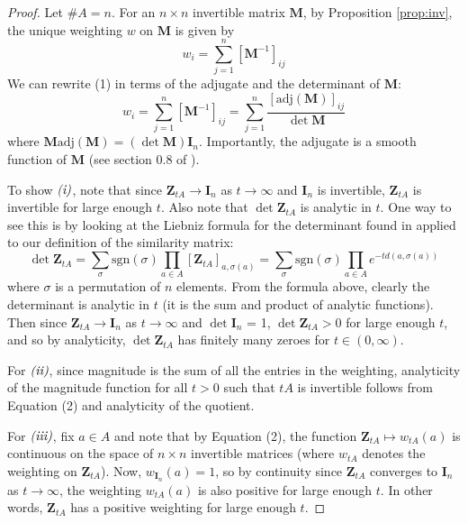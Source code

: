 \documentclass[11pt]{article}
\theoremstyle{definition}
\theoremstyle{definition}
\theoremstyle{plain}
\theoremstyle{plain}
\theoremstyle{plain}
\theoremstyle{definition}
\begin{document}
\begin{proof}
Let $\#A = n$. For an $n \times n$ invertible matrix $\mathbf{M}$, by Proposition \ref{prop:inv}, the unique weighting $w$ on $\mathbf{M}$ is given by
\begin{equation}
w_i = \sum\limits_{j=1}^{n}\left[\mathbf{M}^{-1}\right]_{ij}
\end{equation}
We can rewrite (1) in terms of the adjugate and the determinant of $\mathbf{M}$:
\begin{equation}
w_i = \sum\limits_{j=1}^{n}\left[\mathbf{M}^{-1}\right]_{ij} = \sum\limits_{j=1}^{n} \frac{\left[\text{adj}(\mathbf{M})\right]_{ij}}{{\det{\mathbf{M}}}}
\end{equation}
where $\mathbf{M}\text{adj}(\mathbf{M}) = (\det{\mathbf{M}})\mathbf{I}_n$. Importantly, the adjugate is a smooth function of $\mathbf{M}$ (see section 0.8 of \cite{horn_matrix_2013}).

To show $\emph{(i)}$, note that since $\mathbf{Z}_{tA} \to \mathbf{I}_n$ as $t\to\infty$ and $\mathbf{I}_n$ is invertible, $\mathbf{Z}_{tA}$ is invertible for large enough $t$. Also note that $\det{\mathbf{Z}_{tA}}$ is analytic in $t$. One way to see this is by looking at the Liebniz formula for the determinant found in \cite{horn_matrix_2013} applied to our definition of the similarity matrix:
\begin{equation*}
\det{\mathbf{Z}_{tA}} = \sum\limits_{\sigma} \text{sgn}(\sigma)\prod\limits_{a\in A}\left[\mathbf{Z}_{tA}\right]_{a,\sigma(a)} = \sum\limits_{\sigma}\text{sgn}(\sigma)\prod\limits_{a\in A} e^{-td(a,\sigma(a))}
\end{equation*}
where $\sigma$ is a permutation of $n$ elements. From the formula above, clearly the determinant is analytic in $t$ (it is the sum and product of analytic functions). Then since $\mathbf{Z}_{tA} \to \mathbf{I}_n$ as $t \to\infty$ and $\det\mathbf{I}_n$ = 1, $\det\mathbf{Z}_{tA} > 0$ for large enough $t$, and so by analyticity, $\det\mathbf{Z}_{tA}$ has finitely many zeroes for $t \in (0,\infty)$.

For $\emph{(ii)}$, since magnitude is the sum of all the entries in the weighting, analyticity of the magnitude function for all $t > 0$ such that $tA$ is invertible follows from Equation (2) and analyticity of the quotient.

For $\emph{(iii)}$, fix $a \in A$ and note that by Equation (2), the function $\mathbf{Z}_{tA} \mapsto w_{tA}(a)$ is continuous on the space of $n \times n$ invertible matrices (where $w_{tA}$ denotes the weighting on $\mathbf{Z}_{tA}$). Now, $w_{\mathbf{I}_n}(a) = 1$, so by continuity since $\mathbf{Z}_{tA}$ converges to $\mathbf{I}_n$ as $t \to \infty$, the weighting $w_{tA}(a)$ is also positive for large enough $t$. In other words, $\mathbf{Z}_{tA}$ has a positive weighting for large enough $t$.


\end{proof}
\end{document}
